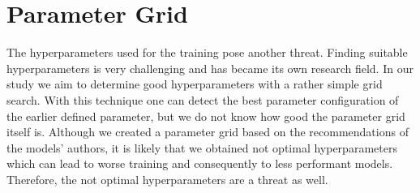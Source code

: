 \section{Parameter Grid}
\label{chp:threats_to_validity:sec:parameter_grid}

The hyperparameters used for the training pose another threat.
Finding suitable hyperparameters is very challenging \parencite{Zeiler:2012} and has became its own research field.
In our study we aim to determine good hyperparameters with a rather simple grid search.
With this technique one can detect the best parameter configuration of the earlier defined parameter, but we do not know how good the parameter grid itself is.
Although we created a parameter grid based on the recommendations of the models' authors, it is likely that we obtained not optimal hyperparameters which can lead to worse training and consequently to less performant models.
Therefore, the not optimal hyperparameters are a threat as well.
